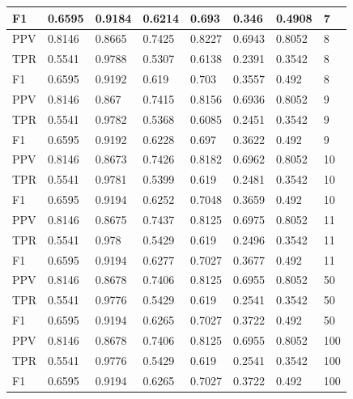 \documentclass{classrep}
\begin{document}
\begin{table}[H]
\begin{adjustbox}{max width=\textwidth}
\begin{tabular}{|l|l|l|l|l|l|l|l|}
        F1 & 0.6595 & 0.9184 & 0.6214 & 0.693 & 0.346 & 0.4908 & 7 \\ \hline
        PPV & 0.8146 & 0.8665 & 0.7425 & 0.8227 & 0.6943 & 0.8052 & 8 \\ \hline
        TPR & 0.5541 & 0.9788 & 0.5307 & 0.6138 & 0.2391 & 0.3542 & 8 \\ \hline
        F1 & 0.6595 & 0.9192 & 0.619 & 0.703 & 0.3557 & 0.492 & 8 \\ \hline
        PPV & 0.8146 & 0.867 & 0.7415 & 0.8156 & 0.6936 & 0.8052 & 9 \\ \hline
        TPR & 0.5541 & 0.9782 & 0.5368 & 0.6085 & 0.2451 & 0.3542 & 9 \\ \hline
        F1 & 0.6595 & 0.9192 & 0.6228 & 0.697 & 0.3622 & 0.492 & 9 \\ \hline
        PPV & 0.8146 & 0.8673 & 0.7426 & 0.8182 & 0.6962 & 0.8052 & 10 \\ \hline
        TPR & 0.5541 & 0.9781 & 0.5399 & 0.619 & 0.2481 & 0.3542 & 10 \\ \hline
        F1 & 0.6595 & 0.9194 & 0.6252 & 0.7048 & 0.3659 & 0.492 & 10 \\ \hline
        PPV & 0.8146 & 0.8675 & 0.7437 & 0.8125 & 0.6975 & 0.8052 & 11 \\ \hline
        TPR & 0.5541 & 0.978 & 0.5429 & 0.619 & 0.2496 & 0.3542 & 11 \\ \hline
        F1 & 0.6595 & 0.9194 & 0.6277 & 0.7027 & 0.3677 & 0.492 & 11 \\ \hline
        PPV & 0.8146 & 0.8678 & 0.7406 & 0.8125 & 0.6955 & 0.8052 & 50 \\ \hline
        TPR & 0.5541 & 0.9776 & 0.5429 & 0.619 & 0.2541 & 0.3542 & 50 \\ \hline
        F1 & 0.6595 & 0.9194 & 0.6265 & 0.7027 & 0.3722 & 0.492 & 50 \\ \hline
        PPV & 0.8146 & 0.8678 & 0.7406 & 0.8125 & 0.6955 & 0.8052 & 100 \\ \hline
        TPR & 0.5541 & 0.9776 & 0.5429 & 0.619 & 0.2541 & 0.3542 & 100 \\ \hline
        F1 & 0.6595 & 0.9194 & 0.6265 & 0.7027 & 0.3722 & 0.492 & 100 \\ \hline
    \end{tabular}
\end{adjustbox}
\end{table}
\end{document}
